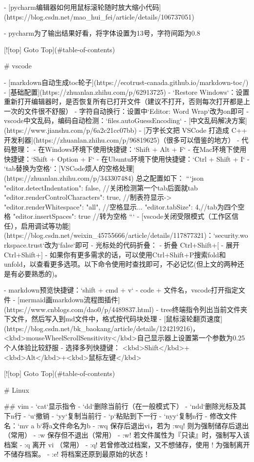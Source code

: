 - [pycharm编辑器如何用鼠标滚轮随时放大缩小代码](https://blog.csdn.net/mao_hui_fei/article/details/106737051)

- pycharm为了输出结果好看，将字体设置为13号，字符间距为0.8

[![top] Goto Top](#table-of-contents)

# vscode

- [markdown自动生成toc轮子](https://ecotrust-canada.github.io/markdown-toc/)
- [基础配置](https://zhuanlan.zhihu.com/p/62913725)
- `Restore Windows`：设置重新打开编辑器时，是否恢复所有已打开文件（建议不打开，否则每次打开都是上一次的文件很不舒服）
- 字符自动换行：设置中`Editor: Word Wrap`改为on即可
- vscode中文乱码，编码自动检测：`files.autoGuessEncoding`
- [中文乱码解决方案](https://www.jianshu.com/p/6a2c21cc07bb)
- [万字长文把 VSCode 打造成 C++ 开发利器](https://zhuanlan.zhihu.com/p/96819625)（很多可以借鉴的地方）
- 代码整理：
  - 在Windows环境下使用快捷键：`Shift + Alt + F`
  - 在Mac环境下使用快捷键：`Shift + Option + F`
  - 在Ubuntu环境下使用快捷键：`Ctrl + Shift + I`
- `tab替换为空格`：[VSCode烦人的空格处理](https://zhuanlan.zhihu.com/p/343307484)
总之配置如下：
```json
"editor.detectIndentation": false,  //关闭检测第一个tab后面就tab
"editor.renderControlCharacters": true, //制表符显示->
"editor.renderWhitespace": "all", //空格显示...
"editor.tabSize": 4,//tab为四个空格
"editor.insertSpaces": true //转为空格
```
- [vscode关闭受限模式（工作区信任），启用调试等功能](https://blog.csdn.net/weixin_45755666/article/details/117877321)：`security.workspace.trust`改为`false`即可
- 光标处的代码折叠：
  - 折叠 Ctrl+Shift+[
  - 展开 Ctrl+Shift+]
  - 如果你有更多需求的话，可以使用Ctrl+Shift+P搜索fold和unfold，以查看更多选项。以下命令使用时查找即可，不必记忆(但上文的两种还是有必要熟悉的)。

- markdown预览快捷键：`shift + cmd + v`
- code + 文件名，vscode打开指定文件
- [mermaid画markdown流程图插件](https://www.cnblogs.com/dao0/p/4489837.html)
- tree终端指令列出当前文件夹下文件，然后写入到md文件中，格式按代码块处理
- [鼠标滚轮翻页速度](https://blog.csdn.net/bk_baokang/article/details/124219216)，<kbd>mouseWheelScrollSensitivity</kbd>自己显示器上设置第一个参数为0.25个人体验比较舒服
- 选择多列快捷键： <kbd>Shift</kbd>+<kbd>Alt</kbd>+<kbd>鼠标左键</kbd>

[![top] Goto Top](#table-of-contents)

# Linux

## vim
- `cat`显示指令
- `dd`删除当前行（在一般模式下）
- `ndd`删除光标及其下n行
- `u`撤销
- `yy`复制当前行
- `p`粘贴到下一行
- `nyy`复制n行
- 修改文件名：`mv a b`将a文件命名为b
- :wq  保存后退出vi，若为 :wq! 则为强制储存后退出（常用）
- :w    保存但不退出（常用）
- :w!   若文件属性为『只读』时，强制写入该档案
- :q    离开 vi （常用）
- :q!   若曾修改过档案，又不想储存，使用 ! 为强制离开不储存档案。
- :e!   将档案还原到最原始的状态！

